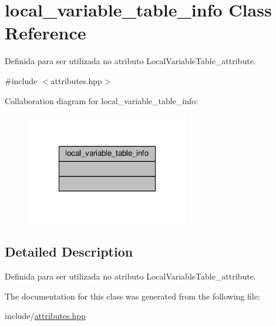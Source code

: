 \hypertarget{classlocal__variable__table__info}{\section{local\+\_\+variable\+\_\+table\+\_\+info Class Reference}
\label{classlocal__variable__table__info}
}


Definida para ser utilizada no atributo Local\+Variable\+Table\+\_\+attribute.  




{\ttfamily \#include $<$attributes.\+hpp$>$}



Collaboration diagram for local\+\_\+variable\+\_\+table\+\_\+info\+:\nopagebreak
\begin{figure}[H]
\begin{center}
\leavevmode
\includegraphics[width=202pt]{classlocal__variable__table__info__coll__graph}
\end{center}
\end{figure}


\subsection{Detailed Description}
Definida para ser utilizada no atributo Local\+Variable\+Table\+\_\+attribute. 

The documentation for this class was generated from the following file\+:\begin{DoxyCompactItemize}
\item 
include/\hyperlink{attributes_8hpp}{attributes.\+hpp}\end{DoxyCompactItemize}
